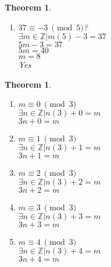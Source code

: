 \documentclass{article}
\newtheorem{theorem}[section]{Theorem}
\begin{document}
\begin{theorem}
\begin{enumerate}
			$5m + 3 = 37$\\
			$5m = 34$\\
			No
		\item[4]
			$37 \equiv -3~\pmod{5}$?\\
			$\exists m \in \mathbb{Z}|m(5) - 3 = 37$\\
			$5m - 3 = 37$\\
			$5m = 40$\\
			$m = 8$\\
			Yes
	\end{enumerate}
\end{theorem}\begin{theorem}%
	\begin{enumerate}
		\item[1]
			$m \equiv 0~\pmod{3}$\\
			$\exists n \in \mathbb{Z}|n(3) + 0 = m$\\
			$3n + 0 = m$\\
		\item[2]
			$m \equiv 1~\pmod{3}$\\
			$\exists n \in \mathbb{Z}|n(3) + 1 = m$\\
			$3n + 1 = m$\\
		\item[3]
			$m \equiv 2~\pmod{3}$\\
			$\exists n \in \mathbb{Z}|n(3) + 2 = m$\\
			$3n + 2 = m$\\
		\item[4]
			$m \equiv 3~\pmod{3}$\\
			$\exists n \in \mathbb{Z}|n(3) + 3 = m$\\
			$3n + 3 = m$\\
		\item[5]
			$m \equiv 4~\pmod{3}$\\
			$\exists n \in \mathbb{Z}|n(3) + 4 = m$\\
			$3n + 4 = m$\\
	\end{enumerate}
\end{theorem}
\end{document}
